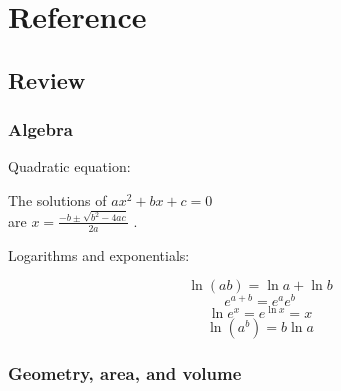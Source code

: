 \chapter{Reference}
\section{Review}

\newcommand{\mathsummaryfont}{\normalsize\normalfont\small}
\newenvironment{ind}
	{%
	}
	{%
	}

\mathsummaryfont

\subsection{Algebra}

\noindent Quadratic equation:

\begin{ind}
  The solutions of $ax^2+bx+c=0$ \\
  are $x=\frac{-b\pm\sqrt{b^2-4ac}}{2a}$ \quad .
\end{ind}

\noindent Logarithms and exponentials:

\begin{ind}
  \begin{equation*}   \ln(ab)=\ln a + \ln b    \end{equation*}
  \begin{equation*}   e^{a+b} = e^ae^b    \end{equation*}
  \begin{equation*}   \ln e^x = e^{\ln x} = x    \end{equation*}
  \begin{equation*}   \ln(a^b) = b \ln a    \end{equation*}
\end{ind}

\subsection{Geometry, area, and volume}

